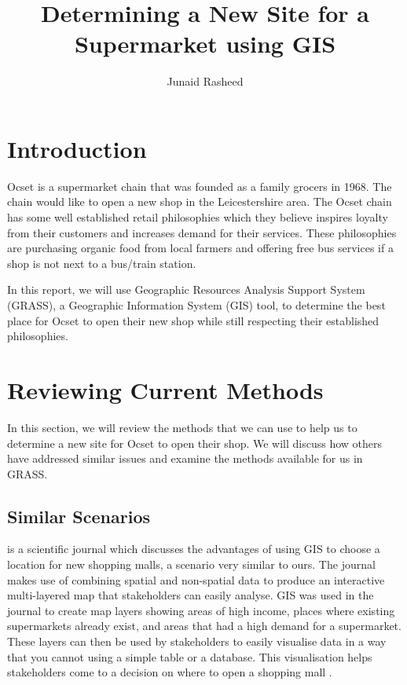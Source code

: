 \documentclass[a4paper,11pt,parskip]{scrartcl}
\title{Determining a New Site for a Supermarket using GIS}
\author{Junaid Rasheed}
\begin{document}
\maketitle

\begin{abstract}
\noindent
\end{abstract}

\section{Introduction}

Ocset is a supermarket chain that was founded as a family grocers in 1968. The chain
would like to open a new shop in the Leicestershire area. The Ocset chain has some well established
retail philosophies which they believe inspires loyalty from their customers and increases demand
for their services. These philosophies are purchasing organic food from local farmers and offering
free bus services if a shop is not next to a bus/train station.

In this report, we will use Geographic Resources Analysis Support System (GRASS), a Geographic Information System
(GIS) tool, to determine the best place for Ocset to open their new shop while still respecting their 
established philosophies.

\section{Reviewing Current Methods}

In this section, we will review the methods that we can use to help us to determine a new site
for Ocset to open their shop. We will discuss how others have addressed similar issues and
examine the methods available for us in GRASS. 

\subsection{Similar Scenarios}

 is a scientific journal which discusses the advantages of using GIS to choose a location for
new shopping malls, a scenario very similar to ours.  The journal makes use of combining spatial and non-spatial data
to produce an interactive multi-layered map that stakeholders can easily analyse. GIS was used in the journal to create 
map layers showing areas of high income, places where existing  supermarkets already exist, and areas that had a 
high demand for a supermarket. These layers can then be used by stakeholders to easily visualise data in a way that
you cannot using a simple table or a database. This visualisation helps stakeholders come to a decision on where to
open a shopping mall \parencite{shoppingMallSelection}.
\end{document}
